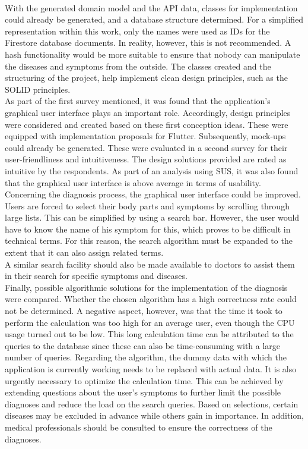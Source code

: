 \newline \\
With the generated domain model and the API data, classes for implementation could already be generated, and a database structure determined. For a simplified representation within this work, only the names were used as IDs for the Firestore database documents. In reality, however, this is not recommended. A hash functionality would be more suitable to ensure that nobody can manipulate the diseases and symptoms from the outside. The classes created and the structuring of the project, help implement clean design principles, such as the SOLID principles.
\newline \\
As part of the first survey mentioned, it was found that the application's graphical user interface plays an important role. Accordingly, design principles were considered and created based on these first conception ideas. These were equipped with implementation proposals for Flutter. Subsequently, mock-ups could already be generated. These were evaluated in a second survey for their user-friendliness and intuitiveness. The design solutions provided are rated as intuitive by the respondents. As part of an analysis using SUS, it was also found that the graphical user interface is above average in terms of usability. Concerning the diagnosis process, the graphical user interface could be improved. Users are forced to select their body parts and symptoms by scrolling through large lists. This can be simplified by using a search bar. However, the user would have to know the name of his symptom for this, which proves to be difficult in technical terms. For this reason, the search algorithm must be expanded to the extent that it can also assign related terms.
\newline \\
A similar search facility should also be made available to doctors to assist them in their search for specific symptoms and diseases.
\newline \\
Finally, possible algorithmic solutions for the implementation of the diagnosis were compared. Whether the chosen algorithm has a high correctness rate could not be determined. A negative aspect, however, was that the time it took to perform the calculation was too high for an average user, even though the CPU usage turned out to be low. This long calculation time can be attributed to the queries to the database since these can also be time-consuming with a large number of queries. Regarding the algorithm, the dummy data with which the application is currently working needs to be replaced with actual data. It is also urgently necessary to optimize the calculation time. This can be achieved by extending questions about the user's symptoms to further limit the possible diagnoses and reduce the load on the search queries. Based on selections, certain diseases may be excluded in advance while others gain in importance. In addition, medical professionals should be consulted to ensure the correctness of the diagnoses. 
